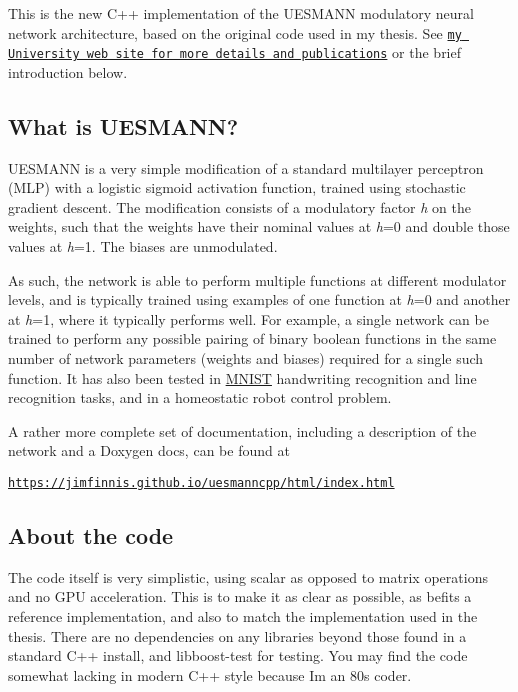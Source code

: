 This is the new C++ implementation of the U\+E\+S\+M\+A\+NN modulatory neural network architecture, based on the original code used in my thesis. See \href{http://users.aber.ac.uk/jcf12/research/uesmann/}{\tt my University web site for more details and publications} or the brief introduction below.

\subsection*{What is U\+E\+S\+M\+A\+NN?}

U\+E\+S\+M\+A\+NN is a very simple modification of a standard multilayer perceptron (M\+LP) with a logistic sigmoid activation function, trained using stochastic gradient descent. The modification consists of a modulatory factor {\itshape h} on the weights, such that the weights have their nominal values at {\itshape h}=0 and double those values at {\itshape h}=1. The biases are unmodulated.

As such, the network is able to perform multiple functions at different modulator levels, and is typically trained using examples of one function at {\itshape h}=0 and another at {\itshape h}=1, where it typically performs well. For example, a single network can be trained to perform any possible pairing of binary boolean functions in the same number of network parameters (weights and biases) required for a single such function. It has also been tested in \hyperlink{classMNIST}{M\+N\+I\+ST} handwriting recognition and line recognition tasks, and in a homeostatic robot control problem.

A rather more complete set of documentation, including a description of the network and a Doxygen docs, can be found at

\href{https://jimfinnis.github.io/uesmanncpp/html/index.html}{\tt https\+://jimfinnis.\+github.\+io/uesmanncpp/html/index.\+html}

\subsection*{About the code}

The code itself is very simplistic, using scalar as opposed to matrix operations and no G\+PU acceleration. This is to make it as clear as possible, as befits a reference implementation, and also to match the implementation used in the thesis. There are no dependencies on any libraries beyond those found in a standard C++ install, and libboost-\/test for testing. You may find the code somewhat lacking in modern C++ style because I\textquotesingle{}m an 80\textquotesingle{}s coder.

